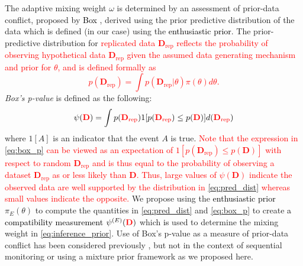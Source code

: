 \documentclass[12pt]{article}
\begin{document}
The adaptive mixing weight $\omega$ is determined by an assessment of prior-data conflict, proposed by \textcolor{black}{Box} \citep{Box1980}, derived using the prior predictive distribution of 
the data which is defined (in our case) using the \textcolor{black}{enthusiastic prior}.
The prior-predictive distribution for \textcolor{red}{replicated data $\mathbf{D}_{\text{rep}}$ reflects the probability of observing hypothetical data $\mathbf{D}_{\text{rep}}$ given 
the assumed data generating mechanism and prior for $\theta$, and is defined formally as
\begin{equation}\label{eq:pred_dist}
p(\mathbf{D}_{\text{rep}}) =\int p(\mathbf{D}_{\text{rep}}|\theta)\pi(\theta)d\theta.
\end{equation}}
\textit{Box's p-value} is defined as the following:
\begin{equation}\label{eq:box_p}
\psi({\textcolor{red}{\mathbf{D}}})=\int {p(\textcolor{red}{\mathbf{D}_{\text{rep}}})}  1[p(\textcolor{red}{\mathbf{D}_{\text{rep}}})\leq p(\textcolor{red}{\mathbf{D}})] d(\textcolor{red}{\mathbf{D}_{\text{rep}}})
\end{equation}
%
where $1[A]$ is an indicator that the event $A$ is true.
%
\textcolor{red}{Note that the expression in \eqref{eq:box_p} can be viewed as an expectation of $1[p(\mathbf{D}_{\text{rep}})\leq p(\mathbf{D})]$ with respect to random $\mathbf{D}_{\text{rep}}$ and is thus equal to the probability of observing a dataset $\mathbf{D}_{\text{rep}}$ as or less likely than $\mathbf{D}$. Thus, large values of $\psi({\mathbf{D}})$ indicate the observed data are well supported by the distribution in \eqref{eq:pred_dist} whereas small values indicate the opposite. 
}
%
%
We propose using the \textcolor{black}{enthusiastic prior} $\pi_E(\theta)$ to compute the quantities in \eqref{eq:pred_dist} and \eqref{eq:box_p} to create \textcolor{black}{a compatibility measurement} $\psi^{(E)}(\textcolor{red}{\mathbf{D}})$ which \textcolor{black}{is} used to determine the mixing weight in \eqref{eq:inference_prior}. Use of Box's p-value as a measure of prior-data conflict has been considered previously \citep{PsiodaXue2020}, but not in the context of sequential monitoring or using a mixture prior framework as we proposed here.
\end{document}

